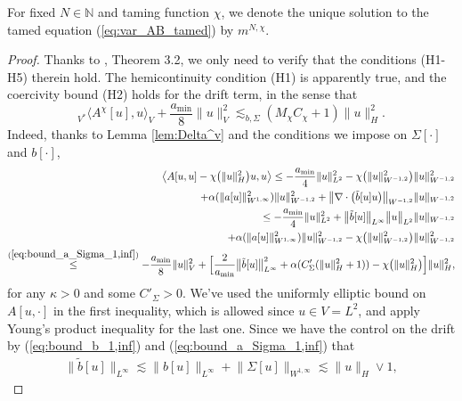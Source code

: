 For fixed $N \in \mathbb{N}$ and taming function $\chi$, we denote the unique solution to the tamed equation (\ref{eq:var_AB_tamed}) by $m^{N,\chi}$.

\begin{proof} 
Thanks to \cite{RSZ22}, Theorem 3.2, we only need to verify that the conditions (H1-H5) therein hold. The hemicontinuity condition (H1) is apparently true, and the coercivity bound (H2) holds for the drift term, in the sense that 
\begin{equation}\label{eq:H2}
    {}_{V^{*}}\big\langle A^{\chi}[u], u\big\rangle_V +  \frac{a_{\min}}{8} \|u\|_V^2 \lesssim_{b,\Sigma} (M_{\chi}C_{\chi} + 1)\|u\|_H^2.
\end{equation} 
 Indeed, thanks to Lemma \ref{lem:Delta^v} and the conditions we impose on $\Sigma[\cdot]$ and $b[\cdot]$, 
\begin{align*}
   \big\langle A[u,u] - \chi\big( \|u\|^2_{H}\big)u, u  \big\rangle
    \leq - \frac{a_{\min}}{4}\|u\|_{L^2}^2 - \chi\big( \|u\|^2_{W^{-1,2}}\big)\|u\|^2_{W^{-1,2}}\\
      + \alpha(\|a[u]\|^2_{W^{1,\infty}}) \|u\|^2_{W^{-1,2}} + \big\|\nabla \cdot \big(\tilde{b}[u] u \big)\big\|_{W^{-1,2}}\|u\|_{W^{-1,2}}
     \\
    \leq  - \frac{a_{\min}}{4}\|u\|_{L^2}^2 + \big\| \tilde{b}[u]\big\|_{L^{\infty}} \big\|u\big\|_{L^2} \|u\|_{W^{-1,2}} \\
    + \alpha(\|a[u]\|^2_{W^{1,\infty}}) \|u\|^2_{W^{-1,2}} - \chi\big( \|u\|^2_{W^{-1,2}}\big)\|u\|^2_{W^{-1,2}}\\
 \overset{(\ref{eq:bound_a_Sigma_1,inf})}{\leq}  -\frac{a_{\min}}{8} \|u\|_{V}^2 
  +  
 \Big[\frac{2}{a_{\min}} \big\|\tilde{b}[u]\big\|_{L^{\infty}}^2 + \alpha(C'_{\Sigma}(\|u\|_H^2 + 1))  - \chi\big( \|u\|^2_{H}\big)\Big]\|u\|^2_{H},
\end{align*}
for any $\kappa > 0$ and some $C'_{\Sigma} > 0$. We've used the uniformly elliptic bound on $A[u,\cdot]$ in the first inequality, which is allowed since $u \in V = L^2$, and apply Young's product inequality for the last one. Since we have the control on the drift by (\ref{eq:bound_b_1,inf}) and (\ref{eq:bound_a_Sigma_1,inf}) that
\begin{equation}\label{eq:tilde_b_L_inf}
\begin{split}
   \big\|\tilde{b}[u]\big\|_{L^{\infty}} \lesssim \big\|b[u]\big\|_{L^{\infty}} + \big\|\Sigma[u]\big\|_{W^{1,\infty}}
    \lesssim \|u\|_{H} \vee 1,
\end{split}
\end{equation}

\end{proof}
